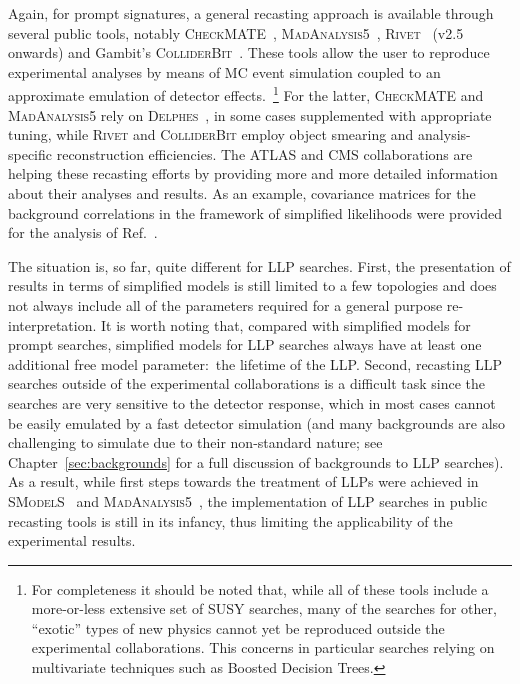 Again, for prompt signatures, a general recasting approach is available through several public
tools, notably \textsc{CheckMATE}~\cite{Drees:2013wra,Dercks:2016npn}, \textsc{MadAnalysis5}~\cite{Conte:2014zja,Dumont:2014tja},
\textsc{Rivet}~{\bf\cite{Buckley:2010ar}} (v2.5 onwards) and Gambit's \textsc{ColliderBit}~\cite{Balazs:2017moi}.
These tools allow the user to reproduce experimental analyses by means of MC event simulation coupled to
an approximate emulation of detector effects.~\footnote{For completeness it should be noted that, while all of these tools include a more-or-less
extensive set of SUSY searches, many of the searches for other, ``exotic'' types of new physics cannot yet be reproduced outside the experimental collaborations. This concerns in particular searches relying on multivariate techniques such as Boosted Decision Trees.}
For the latter, \textsc{CheckMATE} and \textsc{MadAnalysis5} rely on \textsc{Delphes}~\cite{deFavereau:2013fsa},
in some cases supplemented with appropriate tuning,
while \textsc{Rivet} and \textsc{ColliderBit} employ object smearing and analysis-specific reconstruction efficiencies.
The ATLAS and CMS collaborations are helping these recasting efforts by providing more and more
detailed information about their analyses and results. As an example, covariance matrices for the background correlations in the framework of simplified likelihoods were provided for the analysis of Ref.~\cite{CMS-NOTE-2017-001}.

The situation is, so far, quite different for LLP searches.
First, the presentation of results in terms of simplified models
is still limited to a few topologies and does not always include all of the
parameters required for a general purpose re-interpretation.
It is worth noting that, compared with simplified models for prompt searches, simplified models
for LLP searches always have at least one additional free model parameter:~the lifetime of the LLP.
Second, %
recasting LLP searches outside of the experimental collaborations is a
difficult task since the searches are very sensitive to the detector response, which in most cases
cannot be easily emulated by a fast detector simulation (and many backgrounds are also challenging to simulate due to their non-standard nature; see
Chapter~\ref{sec:backgrounds} for a full discussion of backgrounds to LLP searches).
As a result, %
while first steps towards the treatment of LLPs were achieved in \textsc{SModelS}~\cite{Heisig:2018kfq} and
\textsc{MadAnalysis5}~\cite{MA5:longlivedleptons}, the implementation of LLP searches in public recasting tools is
still in its infancy, thus limiting the applicability of the experimental results.

